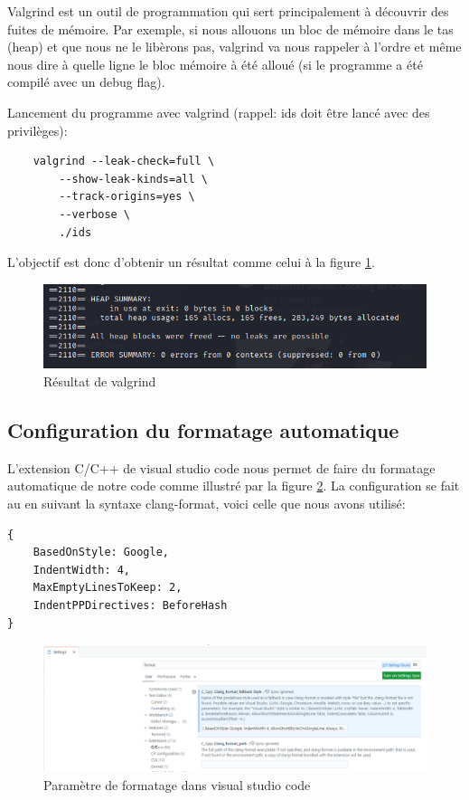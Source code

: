 \documentclass[a4paper]{article}
\begin{document}
Valgrind est un outil de programmation qui sert principalement à découvrir des fuites de mémoire. Par exemple, si nous allouons un bloc de mémoire dans le tas (heap) et que nous ne le libèrons pas, valgrind va nous rappeler à l'ordre et même nous dire à quelle ligne le bloc mémoire à été alloué (si le programme a été compilé avec un debug flag).

Lancement du programme avec valgrind (rappel: ids doit être lancé avec des privilèges):
{\small \begin{verbatim}
    valgrind --leak-check=full \
        --show-leak-kinds=all \
        --track-origins=yes \
        --verbose \
        ./ids
\end{verbatim}}

L'objectif est donc d'obtenir un résultat comme celui à la figure \ref{fig:valgrind}.

\begin{figure}[H]
    \centering
    \includegraphics[width=0.75\linewidth]{../markdown-explanations/images/valgrind-01.PNG}
    \caption{Résultat de valgrind}
    \label{fig:valgrind}
\end{figure}





\subsection{Configuration du formatage automatique}



L'extension C/C++ de visual studio code nous permet de faire du formatage automatique de notre code comme illustré par la figure \ref{fig:formatting}. La configuration se fait au en suivant la syntaxe clang-format, voici celle que nous avons utilisé:

{\small\begin{verbatim}
{
    BasedOnStyle: Google,
    IndentWidth: 4,
    MaxEmptyLinesToKeep: 2,
    IndentPPDirectives: BeforeHash
}
\end{verbatim}}

\begin{figure}[H]
    \centering
    \includegraphics[width=0.99\linewidth]{../markdown-explanations/images/setup-04.PNG}
    \caption{Paramètre de formatage dans visual studio code}
    \label{fig:formatting}
\end{figure}
\end{document}
